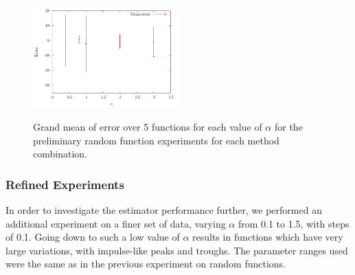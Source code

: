 \documentclass[a4paper,11pt]{article}
\begin{document}
\begin{figure}[h!]
{    \includegraphics[width=0.5\textwidth]{images/gaussian_pmf_random}
    }
    \caption{Grand mean of error over 5 functions for each value of $\alpha$ for the preliminary random
    function experiments for each method combination.}
    \label{fig:randerror}
    \end{figure}
\subsubsection{Refined Experiments}
\label{sec-8-2-2}

    In order to investigate the estimator performance further, we performed an
    additional experiment on a finer set of data, varying $\alpha$ from 0.1 to
    1.5, with steps of 0.1. Going down to such a low value of $\alpha$ results
    in functions which have very large variations, with impulse-like peaks and
    troughs. The parameter ranges used were the same as in the previous
    experiment on random functions.
\end{document}
